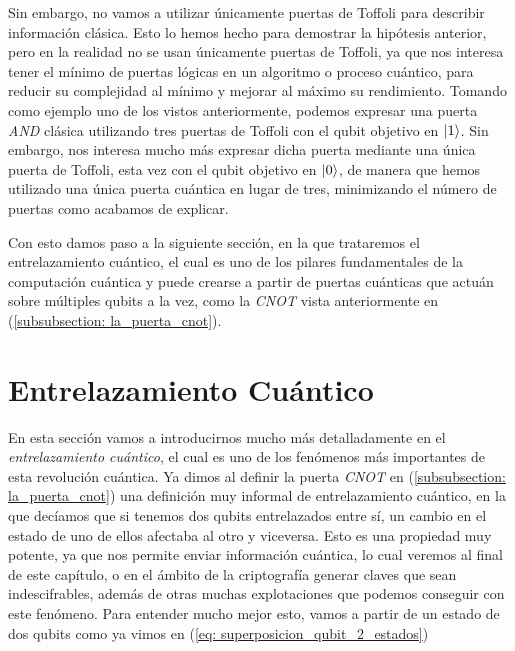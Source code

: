 \documentclass[12pt]{article}
\numberwithin{equation}{section} %
\begin{document}
    \vspace{5mm}

    Sin embargo, no vamos a utilizar únicamente puertas de Toffoli para describir información clásica. Esto lo hemos hecho para demostrar la hipótesis anterior, pero en la realidad no se usan únicamente puertas de Toffoli, ya que nos interesa tener el mínimo de puertas lógicas en un algoritmo o proceso cuántico, para reducir su complejidad al mínimo y mejorar al máximo su rendimiento. Tomando como ejemplo uno de los vistos anteriormente, podemos expresar una puerta \textit{AND} clásica utilizando tres puertas de Toffoli con el qubit objetivo en \( \ket{1} \). Sin embargo, nos interesa mucho más expresar dicha puerta mediante una única puerta de Toffoli, esta vez con el qubit objetivo en \( \ket{0} \), de manera que hemos utilizado una única puerta cuántica en lugar de tres, minimizando el número de puertas como acabamos de explicar.

    \vspace{5mm}

    Con esto damos paso a la siguiente sección, en la que trataremos el entrelazamiento cuántico, el cual es uno de los pilares fundamentales de la computación cuántica y puede crearse a partir de puertas cuánticas que actuán sobre múltiples qubits a la vez, como la \textit{CNOT} vista anteriormente en (\ref{subsubsection: la_puerta_cnot}).

        
        
    
        






    \newpage
    \thispagestyle{empty}
    \mbox{}

    \section{Entrelazamiento Cuántico}\label{sec: entrelazamiento_cuantico}

    \vspace{5mm}
    En esta sección vamos a introducirnos mucho más detalladamente en el \textit{entrelazamiento cuántico}, el cual es uno de los fenómenos más importantes de esta revolución cuántica. Ya dimos al definir la puerta \textit{CNOT} en (\ref{subsubsection: la_puerta_cnot}) una definición muy informal de entrelazamiento cuántico, en la que decíamos que si tenemos dos qubits entrelazados entre sí, un cambio en el estado de uno de ellos afectaba al otro y viceversa. Esto es una propiedad muy potente, ya que nos permite enviar información cuántica, lo cual veremos al final de este capítulo, o en el ámbito de la criptografía generar claves que sean indescifrables, además de otras muchas explotaciones que podemos conseguir con este fenómeno. Para entender mucho mejor esto, vamos a partir de un estado de dos qubits como ya vimos en (\ref{eq: superposicion_qubit_2_estados})
\end{document}
